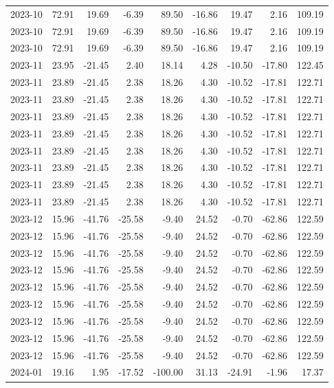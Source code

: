 \begin{table}[ht]
\begin{tabular}{lrrrrrrrr}
  2023-10 & 72.91 & 19.69 & -6.39 & 89.50 & -16.86 & 19.47 & 2.16 & 109.19 \\ 
  2023-10 & 72.91 & 19.69 & -6.39 & 89.50 & -16.86 & 19.47 & 2.16 & 109.19 \\ 
  2023-10 & 72.91 & 19.69 & -6.39 & 89.50 & -16.86 & 19.47 & 2.16 & 109.19 \\ 
  2023-11 & 23.95 & -21.45 & 2.40 & 18.14 & 4.28 & -10.50 & -17.80 & 122.45 \\ 
  2023-11 & 23.89 & -21.45 & 2.38 & 18.26 & 4.30 & -10.52 & -17.81 & 122.71 \\ 
  2023-11 & 23.89 & -21.45 & 2.38 & 18.26 & 4.30 & -10.52 & -17.81 & 122.71 \\ 
  2023-11 & 23.89 & -21.45 & 2.38 & 18.26 & 4.30 & -10.52 & -17.81 & 122.71 \\ 
  2023-11 & 23.89 & -21.45 & 2.38 & 18.26 & 4.30 & -10.52 & -17.81 & 122.71 \\ 
  2023-11 & 23.89 & -21.45 & 2.38 & 18.26 & 4.30 & -10.52 & -17.81 & 122.71 \\ 
  2023-11 & 23.89 & -21.45 & 2.38 & 18.26 & 4.30 & -10.52 & -17.81 & 122.71 \\ 
  2023-11 & 23.89 & -21.45 & 2.38 & 18.26 & 4.30 & -10.52 & -17.81 & 122.71 \\ 
  2023-11 & 23.89 & -21.45 & 2.38 & 18.26 & 4.30 & -10.52 & -17.81 & 122.71 \\ 
  2023-12 & 15.96 & -41.76 & -25.58 & -9.40 & 24.52 & -0.70 & -62.86 & 122.59 \\ 
  2023-12 & 15.96 & -41.76 & -25.58 & -9.40 & 24.52 & -0.70 & -62.86 & 122.59 \\ 
  2023-12 & 15.96 & -41.76 & -25.58 & -9.40 & 24.52 & -0.70 & -62.86 & 122.59 \\ 
  2023-12 & 15.96 & -41.76 & -25.58 & -9.40 & 24.52 & -0.70 & -62.86 & 122.59 \\ 
  2023-12 & 15.96 & -41.76 & -25.58 & -9.40 & 24.52 & -0.70 & -62.86 & 122.59 \\ 
  2023-12 & 15.96 & -41.76 & -25.58 & -9.40 & 24.52 & -0.70 & -62.86 & 122.59 \\ 
  2023-12 & 15.96 & -41.76 & -25.58 & -9.40 & 24.52 & -0.70 & -62.86 & 122.59 \\ 
  2023-12 & 15.96 & -41.76 & -25.58 & -9.40 & 24.52 & -0.70 & -62.86 & 122.59 \\ 
  2023-12 & 15.96 & -41.76 & -25.58 & -9.40 & 24.52 & -0.70 & -62.86 & 122.59 \\ 
  2024-01 & 19.16 & 1.95 & -17.52 & -100.00 & 31.13 & -24.91 & -1.96 & 17.37 \\ 

\end{tabular}
\end{table}
